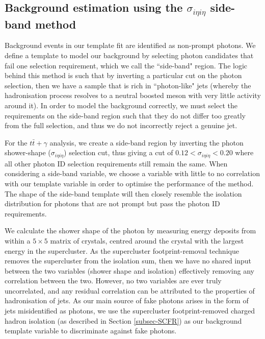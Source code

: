 \subsection{Background estimation using the $\sigma_{i \eta i \eta}$ side-band method} \label{subsec-BackgroundEstimation}

Background events in our template fit are identified as non-prompt photons. We define a template to model our background by selecting photon candidates that fail one selection requirement, which we call the ``side-band" region. The logic behind this method is such that by inverting a particular cut on the photon selection, then we have a sample that is rich in ``photon-like" jets (whereby the hadronisation process resolves to a neutral boosted meson with very little activity around it). In order to model the background correctly, we must select the requirements on the side-band region such that they do not differ too greatly from the full selection, and thus we do not incorrectly reject a genuine jet. 

For the $t\bar{t}+\gamma$ analysis, we create a side-band region by inverting the photon shower-shape ($\sigma_{i\eta i\eta}$) selection cut, thus giving a cut of $0.12 < \sigma_{i \eta i \eta} < 0.20$ where all other photon ID selection requirements still remain the same. When considering a side-band variable, we choose a variable with little to no correlation with our template variable in order to optimise the performance of the method. The shape of the side-band template will then closely resemble the isolation distribution for photons that are not prompt but pass the photon ID requirements. 

We calculate the shower shape of the photon by measuring energy deposits from within a $5 \times 5$ matrix of crystals, centred around the crystal with the largest energy in the supercluster. As the supercluster footprint-removal technique removes the supercluster from the isolation sum, then we have no shared input between the two variables (shower shape and isolation) effectively removing any correlation between the two. However, no two variables are ever truly uncorrelated, and any residual correlation can be attributed to the properties of hadronisation of jets. As our main source of fake photons arises in the form of jets misidentified as photons, we use the supercluster footprint-removed charged hadron isolation (as described in Section \ref{subsec-SCFR}) as our background template variable to discriminate against fake photons.

